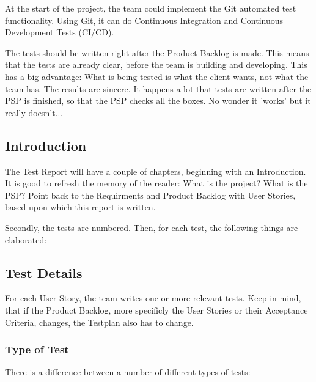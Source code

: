 \documentclass[10pt]{report}
\begin{document}
At the start of the project, the team could implement the Git automated test functionality. Using Git, it can do Continuous Integration and Continuous Development Tests (CI/CD).

\bigskip

The tests should be written right after the Product Backlog is made. This means that the tests are already clear, before the team is building and developing. This has a big advantage: What is being tested is what the client wants, not what the team has. The results are sincere. It happens a lot that tests are written after the PSP is finished, so that the PSP checks all the boxes. No wonder it 'works' but it really doesn't...

\subsection{Introduction}

The Test Report will have a couple of chapters, beginning with an Introduction. It is good to refresh the memory of the reader: What is the project? What is the PSP? Point back to the Requirments and Product Backlog with User Stories, based upon which this report is written.

Secondly, the tests are numbered. Then, for each test, the following things are elaborated:

\subsection{Test Details}

For each User Story, the team writes one or more relevant tests. Keep in mind, that if the Product Backlog, more specificly the User Stories or their Acceptance Criteria, changes, the Testplan also has to change. 

\subsubsection{Type of Test}
There is a difference between a number of different types of tests:
\end{document}
